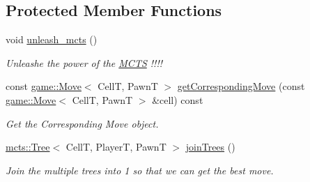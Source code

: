 \subsection*{Protected Member Functions}
\begin{DoxyCompactItemize}
\item 
void \hyperlink{classmcts_1_1_m_c_t_s_player_a53677f7c7f9cfe4b7999af8abcfb8641}{unleash\+\_\+mcts} ()
\begin{DoxyCompactList}\small\item\em Unleashe the power of the \hyperlink{classmcts_1_1_m_c_t_s}{M\+C\+TS} !!!! \end{DoxyCompactList}\item 
const \hyperlink{structgame_1_1_move}{game\+::\+Move}$<$ CellT, PawnT $>$ \hyperlink{classmcts_1_1_m_c_t_s_player_aa68be6bbbbd01044d42b9c2d0149b366}{get\+Corresponding\+Move} (const \hyperlink{structgame_1_1_move}{game\+::\+Move}$<$ CellT, PawnT $>$ \&cell) const
\begin{DoxyCompactList}\small\item\em Get the Corresponding Move object. \end{DoxyCompactList}\item 
\hyperlink{classmcts_1_1_tree}{mcts\+::\+Tree}$<$ CellT, PlayerT, PawnT $>$ \hyperlink{classmcts_1_1_m_c_t_s_player_a9e8202cd2530b6ecc20f873d899823da}{join\+Trees} ()
\begin{DoxyCompactList}\small\item\em Join the multiple trees into 1 so that we can get the best move. \end{DoxyCompactList}\end{DoxyCompactItemize}
